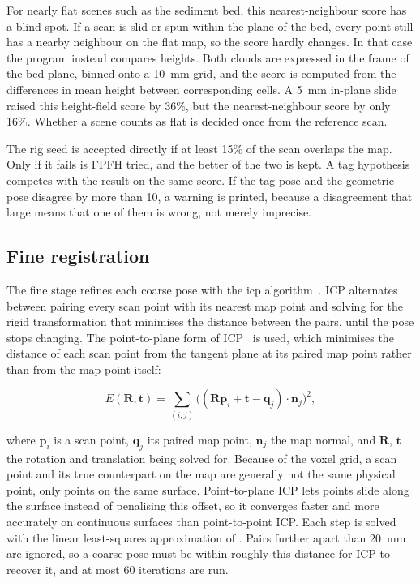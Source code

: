 For nearly flat scenes such as the sediment bed, this nearest-neighbour score has a blind spot. If a scan is slid or spun within the plane of the bed, every point still has a nearby neighbour on the flat map, so the score hardly changes. In that case the program instead compares heights. Both clouds are expressed in the frame of the bed plane, binned onto a 10~mm grid, and the score is computed from the differences in mean height between corresponding cells. A 5~mm in-plane slide raised this height-field score by 36\%, but the nearest-neighbour score by only 16\%. Whether a scene counts as flat is decided once from the reference scan.

The rig seed is accepted directly if at least 15\% of the scan overlaps the map. Only if it fails is FPFH tried, and the better of the two is kept. A tag hypothesis competes with the result on the same score. If the tag pose and the geometric pose disagree by more than 10\degree{}, a warning is printed, because a disagreement that large means that one of them is wrong, not merely imprecise.

\subsection{Fine registration}

The fine stage refines each coarse pose with the \gls{icp} algorithm~\citep{beslMethodRegistration3D1992}. ICP alternates between pairing every scan point with its nearest map point and solving for the rigid transformation that minimises the distance between the pairs, until the pose stops changing. The point-to-plane form of ICP~\citep{chenObjectModellingRegistration1992} is used, which minimises the distance of each scan point from the tangent plane at its paired map point rather than from the map point itself:

\begin{equation}
	E(\mathbf{R},\mathbf{t}) = \sum_{(i,j)}
	\Big( (\mathbf{R}\mathbf{p}_i + \mathbf{t} - \mathbf{q}_j)
	\cdot \mathbf{n}_j \Big)^2 ,
\end{equation}

where $\mathbf{p}_i$ is a scan point, $\mathbf{q}_j$ its paired map point, $\mathbf{n}_j$ the map normal, and $\mathbf{R}$, $\mathbf{t}$ the rotation and translation being solved for. Because of the voxel grid, a scan point and its true counterpart on the map are generally not the same physical point, only points on the same surface. Point-to-plane ICP lets points slide along the surface instead of penalising this offset, so it converges faster and more accurately on continuous surfaces than point-to-point ICP. Each step is solved with the linear least-squares approximation of \citet{lowLinearLeastSquaresOptimizationa}. Pairs further apart than 20~mm are ignored, so a coarse pose must be within roughly this distance for ICP to recover
it, and at most 60 iterations are run.

